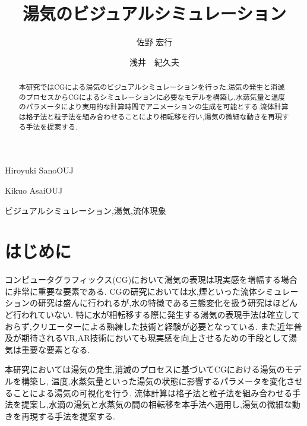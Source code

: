 \documentclass[submit,techrep]{ipsj}
\begin{document}
\title{湯気のビジュアルシミュレーション}





\author{佐野 宏行}{Hiroyuki Sano}{OUJ}
\author{浅井　紀久夫}{Kikuo Asai}{OUJ}

\begin{abstract}
本研究ではCGによる湯気のビジュアルシミュレーションを行った.湯気の発生と消滅のプロセスからCGによるシミュレーションに必要なモデルを構築し,水蒸気量と温度のパラメータにより実用的な計算時間でアニメーションの生成を可能とする.流体計算は格子法と粒子法を組み合わせることにより相転移を行い,湯気の微細な動きを再現する手法を提案する.
\end{abstract}


\begin{jkeyword}
ビジュアルシミュレーション,湯気,流体現象
\end{jkeyword}

\maketitle

\section{はじめに}

コンピュータグラフィックス(CG)において湯気の表現は現実感を増幅する場合に非常に重要な要素である.
CGの研究においては水,煙といった流体シミュレーションの研究は盛んに行われるが,水の特徴である三態変化を扱う研究はほどんど行われていない.
特に水が相転移する際に発生する湯気の表現手法は確立しておらず,クリエーターによる熟練した技術と経験が必要となっている.
また近年普及が期待されるVR,AR技術においても現実感を向上させるための手段として湯気は重要な要素となる.

本研究においては湯気の発生,消滅のプロセスに基づいてCGにおける湯気のモデルを構築し,
温度,水蒸気量といった湯気の状態に影響するパラメータを変化させることによる湯気の可視化を行う.
流体計算は格子法と粒子法を組み合わせる手法を提案し,水滴の湯気と水蒸気の間の相転移を本手法へ適用し,湯気の微細な動きを再現する手法を提案する.


\end{document}
